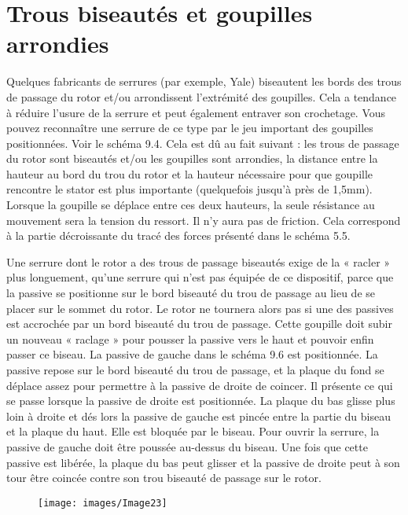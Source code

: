 \documentclass[a4paper,french,11pt,twoside]{report}
\begin{document}
\section{Trous biseautés et goupilles arrondies}

Quelques fabricants de serrures (par exemple, Yale) biseautent les bords des trous de passage du rotor et/ou arrondissent l'extrémité des goupilles. Cela a tendance à réduire l'usure de la serrure et peut également entraver son crochetage. Vous pouvez reconnaître une serrure de ce type par le jeu important des goupilles positionnées. Voir le schéma 9.4. Cela est dû au fait suivant : les trous de passage du rotor sont biseautés et/ou les goupilles sont arrondies, la distance entre la hauteur au bord du trou du rotor et la hauteur nécessaire pour que goupille rencontre le stator est plus importante (quelquefois jusqu'à près de 1,5mm). Lorsque la goupille se déplace entre ces deux hauteurs, la seule résistance au mouvement sera la tension du ressort. Il n'y aura pas de friction. Cela correspond à la partie décroissante du tracé des forces présenté dans le schéma 5.5.

Une serrure dont le rotor a des trous de passage biseautés exige de la « racler » plus longuement, qu'une serrure qui n'est pas équipée de ce dispositif, parce que la passive se positionne sur le bord biseauté du trou de passage au lieu de se placer sur le sommet du rotor. Le rotor ne tournera alors pas si une des passives est accrochée par un bord biseauté du trou de passage. Cette goupille doit subir un nouveau « raclage » pour pousser la passive vers le haut et pouvoir enfin passer ce biseau. La passive de gauche dans le schéma 9.6 est positionnée. La passive repose sur le bord biseauté du trou de passage, et la plaque du fond se déplace assez pour permettre à la passive de droite de coincer. Il présente ce qui se passe lorsque la passive de droite est positionnée. La plaque du bas glisse plus loin à droite et dés lors la passive de gauche est pincée entre la partie du biseau et la plaque du haut. Elle est bloquée par le biseau. Pour ouvrir la serrure, la passive de gauche doit être poussée au-dessus du biseau. Une fois que cette passive est libérée, la plaque du bas peut glisser et la passive de droite peut à son tour être coincée contre son trou biseauté de passage sur le rotor.

\begin{figure}[ht] \begin{center}
        \texttt{[image: images/Image23]}
        \caption{}
\end{center} \end{figure}
\end{document}
